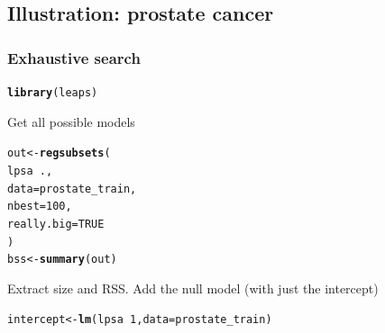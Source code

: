 \documentclass{beamer}\usepackage[]{graphicx}\usepackage[]{color}
\makeatletter
\newcommand{\hlnum}[1]{\textcolor[rgb]{0.686,0.059,0.569}{#1}}%
\newcommand{\hlopt}[1]{\textcolor[rgb]{0,0,0}{#1}}%
\newcommand{\hlstd}[1]{\textcolor[rgb]{0.345,0.345,0.345}{#1}}%
\newcommand{\hlkwb}[1]{\textcolor[rgb]{0.69,0.353,0.396}{#1}}%
\newcommand{\hlkwc}[1]{\textcolor[rgb]{0.333,0.667,0.333}{#1}}%
\newcommand{\hlkwd}[1]{\textcolor[rgb]{0.737,0.353,0.396}{\textbf{#1}}}%
\newenvironment{kframe}{%
 \def\at@end@of@kframe{}%
 \ifinner\ifhmode%
  \def\at@end@of@kframe{\end{minipage}}%
  \begin{minipage}{\columnwidth}%
 \fi\fi%
 \def\FrameCommand##1{\hskip\@totalleftmargin \hskip-\fboxsep
 \colorbox{shadecolor}{##1}\hskip-\fboxsep
     \hskip-\linewidth \hskip-\@totalleftmargin \hskip\columnwidth}%
 \MakeFramed {\advance\hsize-\width
   \@totalleftmargin\z@ \linewidth\hsize
   \@setminipage}}%
 {\par\unskip\endMakeFramed%
 \at@end@of@kframe}
\newenvironment{knitrout}{}{} %
\makeatother
\begin{document}
\subsection{Illustration: prostate cancer}



\begin{frame}
  \frametitle{Exhaustive search}

\begin{knitrout}\scriptsize
{}\color{fgcolor}\begin{kframe}
\begin{alltt}
\hlkwd{library}\hlstd{(leaps)}
\end{alltt}
\end{kframe}
\end{knitrout}

Get all possible models
\begin{knitrout}\scriptsize
{}\color{fgcolor}\begin{kframe}
\begin{alltt}
\hlstd{out} \hlkwb{<-} \hlkwd{regsubsets}\hlstd{(}
          \hlstd{lpsa} \hlopt{~} \hlstd{. ,}
          \hlkwc{data}  \hlstd{= prostate_train,}
          \hlkwc{nbest} \hlstd{=} \hlnum{100}\hlstd{,}
          \hlkwc{really.big} \hlstd{=} \hlnum{TRUE}
        \hlstd{)}
\hlstd{bss} \hlkwb{<-} \hlkwd{summary}\hlstd{(out)}
\end{alltt}
\end{kframe}
\end{knitrout}

Extract size and RSS. Add the null model (with just the intercept)
\begin{knitrout}\scriptsize
{}\color{fgcolor}\begin{kframe}
\begin{alltt}
\hlstd{intercept} \hlkwb{<-} \hlkwd{lm}\hlstd{(lpsa} \hlopt{~} \hlnum{1}\hlstd{,} \hlkwc{data} \hlstd{= prostate_train)}
\end{alltt}
\end{kframe}
\end{knitrout}


\end{frame}
\end{document}
